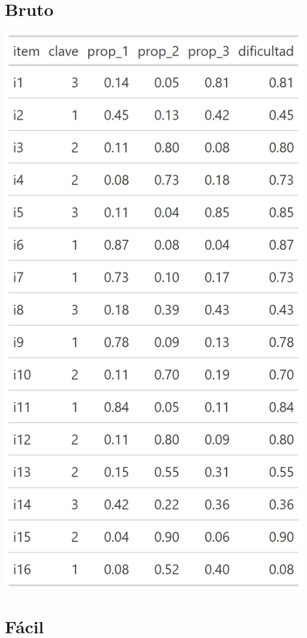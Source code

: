 \documentclass[
  letterpaper,
  DIV=11,
  numbers=noendperiod]{scrreprt}
\begin{document}
\section{Bruto}

\begin{center}
\includegraphics[width=0.6\linewidth,height=\textheight,keepaspectratio]{images/teoria_clasica_diff_blank.png}
\end{center}

\section{Fácil}
\end{document}
